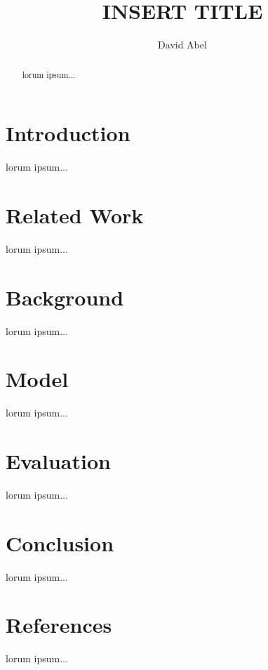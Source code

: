 \documentclass[a4paper]{article}
\title{INSERT TITLE}
\author{David Abel}
\date{}
\begin{document}
\maketitle

\begin{abstract}
lorum ipsum...
\end{abstract}

\section{Introduction}

lorum ipsum...

\section{Related Work}
lorum ipsum...
\section{Background}
lorum ipsum...
\section{Model}
lorum ipsum...
\section{Evaluation}
lorum ipsum...
\section{Conclusion}
lorum ipsum...

\section{References}
lorum ipsum...
\end{document}
